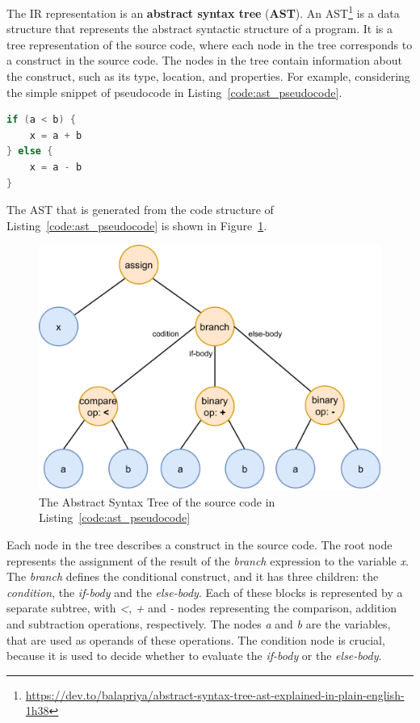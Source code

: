 The IR representation is an \textbf{abstract syntax tree} (\textbf{AST}). An AST\footnote{\url{https://dev.to/balapriya/abstract-syntax-tree-ast-explained-in-plain-english-1h38}} is a data structure that represents the abstract syntactic structure of a program. It is a tree representation of the source code, where each node in the tree corresponds to a construct in the source code. The nodes in the tree contain information about the construct, such as its type, location, and properties.\newline
For example, considering the simple snippet of pseudocode in Listing~\ref{code:ast_pseudocode}.
\begin{lstlisting}[caption={Pseudocode of a simple assignment and expression}, language=Kotlin, captionpos=b, label={code:ast_pseudocode}]
if (a < b) {
    x = a + b
} else {
    x = a - b
}
\end{lstlisting}
The AST that is generated from the code structure of Listing~\ref{code:ast_pseudocode} is shown in Figure~\ref{fig:ast_pseudocode_example}.
\begin{figure}[!ht]
    \centering
    \includegraphics[scale=0.8]{document/chapters/2-metaprogramming/images/ast_pseudocode_example.pdf}
    \caption{The Abstract Syntax Tree of the source code in Listing~\ref{code:ast_pseudocode}}
    \label{fig:ast_pseudocode_example}
\end{figure}
Each node in the tree describes a construct in the source code. The root node represents the assignment of the result of the \textit{branch} expression to the variable \textit{x}. The \textit{branch} defines the conditional construct, and it has three children: the \textit{condition}, the \textit{if-body} and the \textit{else-body}. Each of these blocks is represented by a separate subtree, with \textit{<}, \textit{+} and \textit{-} nodes representing the comparison, addition and subtraction operations, respectively. The nodes \textit{a} and \textit{b} are the variables, that are used as operands of these operations.\newline
The condition node is crucial, because it is used to decide whether to evaluate the \textit{if-body} or the \textit{else-body}.

